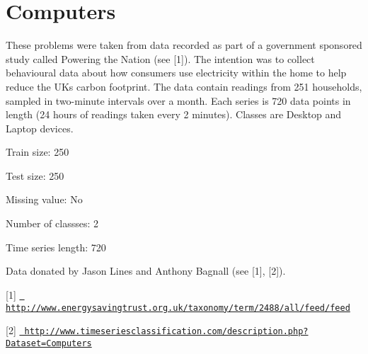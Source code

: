 \chapter{Computers}
\hypertarget{md_external_2data_2UCRArchive__2018_2Computers_2README}{}\label{md_external_2data_2UCRArchive__2018_2Computers_2README}
\label{md_external_2data_2UCRArchive__2018_2Computers_2README_autotoc_md36}%
%
 These problems were taken from data recorded as part of a government sponsored study called Powering the Nation (see \mbox{[}1\mbox{]}). The intention was to collect behavioural data about how consumers use electricity within the home to help reduce the UK\textquotesingle{}s carbon footprint. The data contain readings from 251 households, sampled in two-\/minute intervals over a month. Each series is 720 data points in length (24 hours of readings taken every 2 minutes). Classes are Desktop and Laptop devices.

Train size\+: 250

Test size\+: 250

Missing value\+: No

Number of classses\+: 2

Time series length\+: 720

Data donated by Jason Lines and Anthony Bagnall (see \mbox{[}1\mbox{]}, \mbox{[}2\mbox{]}).

\mbox{[}1\mbox{]} \href{http://www.energysavingtrust.org.uk/taxonomy/term/2488/all/feed/feed}{\texttt{ http\+://www.\+energysavingtrust.\+org.\+uk/taxonomy/term/2488/all/feed/feed}}

\mbox{[}2\mbox{]} \href{http://www.timeseriesclassification.com/description.php?Dataset=Computers}{\texttt{ http\+://www.\+timeseriesclassification.\+com/description.\+php?\+Dataset=\+Computers}} 